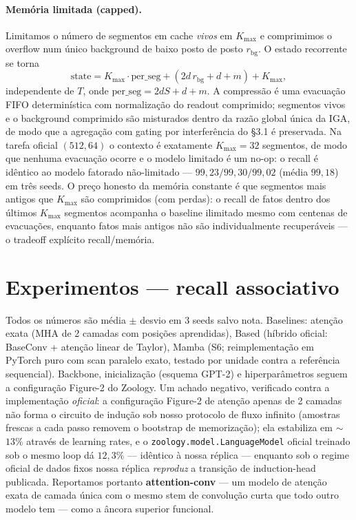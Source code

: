 \documentclass[11pt]{article}
\begin{document}
\paragraph{Mem\'oria limitada (capped).} Limitamos o n\'umero de segmentos em
cache \emph{vivos} em $K_{\max}$ e comprimimos o overflow num \'unico background
de baixo posto de posto $r_{\mathrm{bg}}$. O estado recorrente se torna
\[
\mathrm{state} = K_{\max}\!\cdot\!\mathrm{per\_seg}
               + (2d\,r_{\mathrm{bg}} + d + m) + K_{\max},
\]
independente de $T$, onde $\mathrm{per\_seg}=2dS+d+m$. A compress\~ao \'e uma
evacua\c{c}\~ao FIFO determin\'istica com normaliza\c{c}\~ao do readout
comprimido; segmentos vivos e o background comprimido s\~ao misturados dentro da
raz\~ao global \'unica da IGA, de modo que a agrega\c{c}\~ao com gating por
interfer\^encia do \S3.1 \'e preservada. Na tarefa oficial $(512,64)$ o contexto
\'e exatamente $K_{\max}=32$ segmentos, de modo que nenhuma evacua\c{c}\~ao ocorre
e o modelo limitado \'e um no-op: o recall \'e id\^entico ao modelo fatorado
n\~ao-limitado --- $99{,}23/99{,}30/99{,}02$ (m\'edia $99{,}18$) em tr\^es seeds. O
pre\c{c}o honesto da mem\'oria constante \'e que segmentos mais antigos que
$K_{\max}$ s\~ao comprimidos (com perdas): o recall de fatos dentro dos \'ultimos
$K_{\max}$ segmentos acompanha o baseline ilimitado mesmo com centenas de
evacua\c{c}\~oes, enquanto fatos mais antigos n\~ao s\~ao individualmente
recuper\'aveis --- o tradeoff expl\'icito recall/mem\'oria.

\section{Experimentos --- recall associativo}

Todos os n\'umeros s\~ao m\'edia $\pm$ desvio em 3 seeds salvo nota. Baselines:
aten\c{c}\~ao exata (MHA de 2 camadas com posi\c{c}\~oes aprendidas), Based
(h\'ibrido oficial: BaseConv + aten\c{c}\~ao linear de Taylor), Mamba (S6;
reimplementa\c{c}\~ao em PyTorch puro com scan paralelo exato, testado por
unidade contra a refer\^encia sequencial). Backbone, inicializa\c{c}\~ao (esquema
GPT-2) e hiperpar\^ametros seguem a configura\c{c}\~ao Figure-2 do Zoology. Um
achado negativo, verificado contra a implementa\c{c}\~ao \emph{oficial}: a
configura\c{c}\~ao Figure-2 de aten\c{c}\~ao apenas de 2 camadas n\~ao forma o
circuito de indu\c{c}\~ao sob nosso protocolo de fluxo infinito (amostras frescas
a cada passo removem o bootstrap de memoriza\c{c}\~ao); ela estabiliza em
$\sim$$13\%$ atrav\'es de learning rates, e o
\texttt{zoology.model.LanguageModel} oficial treinado sob o mesmo loop d\'a
$12{,}3\%$ --- id\^entico \`a nossa r\'eplica --- enquanto sob o regime oficial de
dados fixos nossa r\'eplica \emph{reproduz} a transi\c{c}\~ao de induction-head
publicada. Reportamos portanto \textbf{attention-conv} --- um modelo de
aten\c{c}\~ao exata de camada \'unica com o mesmo stem de convolu\c{c}\~ao curta
que todo outro modelo tem --- como a \^ancora superior funcional.
\end{document}
